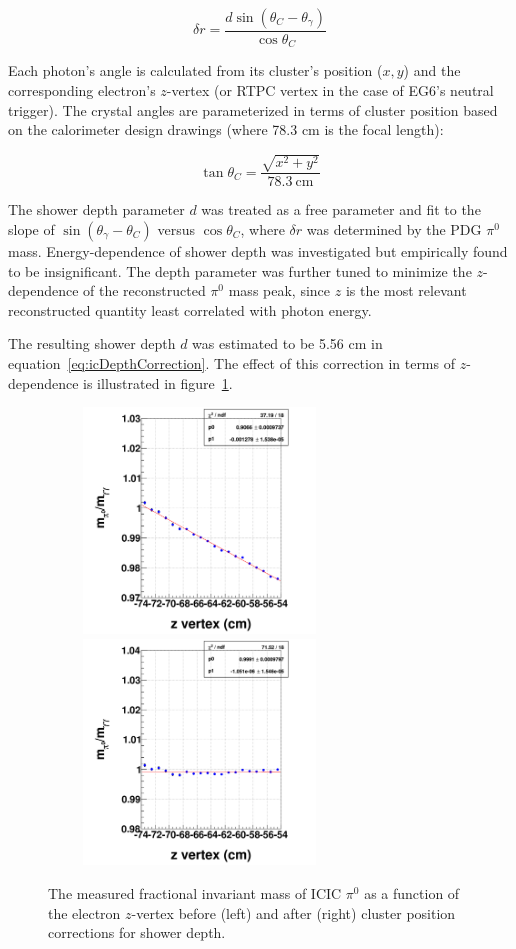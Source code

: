 \begin{equation}
  \delta r = \frac{d\sin(\theta_C-\theta_\gamma)}{\cos\theta_C}
  \label{eq:icDepthCorrection}
\end{equation}

Each photon's angle is calculated from its cluster's position ($x,y$) and the corresponding electron's $z$-vertex (or RTPC vertex in the case of EG6's neutral trigger).  The crystal angles are parameterized in terms of cluster position based on the calorimeter design drawings (where 78.3 cm is the focal length):

\begin{equation}
  \tan\theta_C=\frac{\sqrt{x^2+y^2}}{78.3\ \mathrm{cm}}
  \label{eq:cystalAngles}
\end{equation}

The shower depth parameter $d$ was treated as a free parameter and fit to the slope of $\sin(\theta_\gamma-\theta_C)$ versus $\cos\theta_C$, where $\delta r$ was determined by the PDG $\pi^0$ mass.  Energy-dependence of shower depth was investigated but empirically found to be insignificant.  The depth parameter was further tuned to minimize the $z$-dependence of the reconstructed $\pi^0$ mass peak, since $z$ is the most relevant reconstructed quantity least correlated with photon energy.

The resulting shower depth $d$ was estimated to be 5.56 cm in equation~\ref{eq:icDepthCorrection}.  The effect of this correction in terms of $z$-dependence is illustrated in figure~\ref{fig:ic_exp_correction_inv_mass_comp}.

\begin{figure}[tbp]
\centering
\includegraphics[width=8cm,height=6cm]{fig_analysis/NoDepthRunRadialE_finvMass_vz_pi0.png}
\includegraphics[width=8cm,height=6cm]{fig_analysis/NewDepthRunRadialE_finvMass_vz_pi0.png}
\caption{The measured fractional invariant mass of ICIC $\pi^{0}$ as a function of the electron $z$-vertex before (left) and after (right) cluster position corrections for shower depth.} 
\label{fig:ic_exp_correction_inv_mass_comp}
\end{figure}

